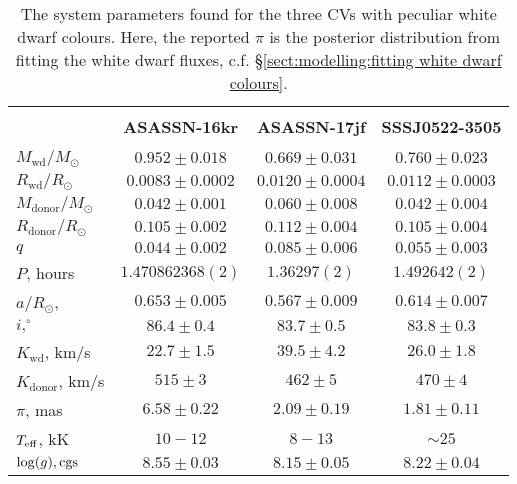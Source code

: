 \begin{landscape}
    \begin{table*}
        \centering
        \caption{The system parameters found for the three CVs with peculiar white dwarf colours. Here, the reported $\pi$ is the posterior distribution from fitting the white dwarf fluxes, c.f. \S\ref{sect:modelling:fitting white dwarf colours}.}
        \label{appendix:table:three white dwarfs:system_parameters}
        \begin{tabular}{lccc}
            \hline \\
            ~                          & \textbf{ASASSN-16kr}    & \textbf{ASASSN-17jf}  & \textbf{SSSJ0522-3505} \\
            \hline \hline \\
            $M_\mathrm{wd}/M_\odot$    & $0.952\pm0.018$         & $0.669\pm0.031$        & $0.760\pm0.023$ \\
            $R_\mathrm{wd}/R_\odot$    & $0.0083\pm0.0002$       & $0.0120\pm0.0004$      & $0.0112\pm0.0003$ \\
            $M_\mathrm{donor}/M_\odot$ & $0.042\pm0.001$         & $0.060\pm0.008$        & $0.042\pm0.004$ \\
            $R_\mathrm{donor}/R_\odot$ & $0.105\pm0.002$         & $0.112\pm0.004$        & $0.105\pm0.004$ \\
            $q$                        & $0.044\pm0.002$         & $0.085\pm0.006$        & $0.055\pm0.003$ \\
            \hline
            $P$, hours                 & $1.470862368(2)$        & $1.36297(2)$           & $1.492642(2)$ \\
            $a/R_\odot$,               & $0.653\pm0.005$         & $0.567\pm0.009$        & $0.614\pm0.007$  \\
            $i, ^\circ$                & $86.4\pm0.4$            & $83.7\pm0.5$           & $83.8\pm0.3$  \\
            $K_\mathrm{wd}$, km/s      & $22.7\pm1.5$            & $39.5\pm4.2$           & $26.0\pm1.8$  \\
            $K_\mathrm{donor}$, km/s   & $515\pm3$               & $462\pm5$              & $470\pm4$  \\
            \hline
            $\pi$, mas                 & $6.58\pm0.22$           & $2.09\pm0.19$          & $1.81\pm0.11$  \\
            $T_{\rm eff}$, kK          & $10-12$                 & $8-13$                 & $\sim25$  \\
            $\log(g), {\rm cgs}$       & $8.55\pm0.03$           & $8.15\pm0.05$          & $8.22\pm0.04$  \\
            \hline
            \hline
        \end{tabular}
    \end{table*}



\end{landscape}
